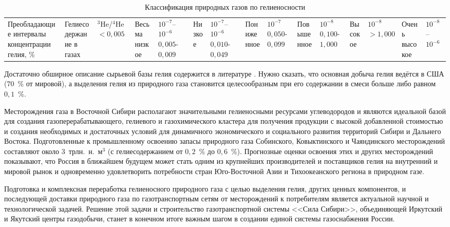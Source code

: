 \begin{table} [htbp]
	\centering
	\changecaptionwidth\captionwidth{15cm}
	\caption{Классификация природных газов по гелиеносности \cite{Yakuceni_Material_Base}}\label{tbl:He_deposit_classification}%
	\begin{tabular}{|p{5cm}||p{5cm}|p{3cm}|}
		\hline
		Преобладающие интервалы концентрации гелия, \%   & \centering Гелиесодержание в газах & \centering  $^3$He/$^4$He  \cr
		\hline
		\centering $<0,005$ & \centering  Весьма низкое  &\centering $10^{-7}$--$10^{-6}$  \cr
		\centering $0,005$-$0,009$ &\centering Низкое  &\centering $10^{-7}$--$10^{-6}$  \cr
		\centering $0,010$-$0,049$ &\centering Пониженное  &\centering $10^{-7}$  \cr		
		\centering $0,050$-$0,099$ &\centering Повышенное  &\centering $10^{-8}$  \cr		
		\centering $0,100$-$1,000$ &\centering Высокое  &\centering $10^{-8}$  \cr		
		\centering $>1,000$ &\centering Очень высокое  &\centering $10^{-8}$--$10^{-6}$ \cr		
		\hline
	\end{tabular}
\end{table}


Достаточно обширное описание сырьевой базы гелия содержится в литературе  \cite{Yakuceni_Material_Base, Kryukov}. Нужно сказать, что основная добыча гелия ведётся в США ($70$~\% от мировой), а  выделения гелия из природного газа становится  целесообразным при его содержании в смеси больше либо равном $0,1$~\%.

Месторождения газа в Восточной Сибири располагают значительными гелиеносными ресурсами углеводородов и являются идеальной базой для создания газоперерабатывающего, гелиевого и газохимического кластера для получения продукции с высокой добавленной стоимостью и создания необходимых и достаточных условий для динамичного экономического и социального развития территорий Сибири и Дальнего Востока. Подготовленные к промышленному освоению запасы природного газа Собинского, Ковыктинского и Чаяндинского месторождений составляют около $3$~трлн.~н.~м$^3$ (с гелиесодержанием от $0,2$~\% до $0,6$~\%). Прогнозные оценки освоения этих и других месторождений показывают, что Россия в ближайшем будущем может стать одним из крупнейших производителей и поставщиков гелия на внутренний и мировой рынок и одновременно удовлетворить потребности стран Юго-Восточной Азии и Тихоокеанского региона в природном газе.




Подготовка и комплексная переработка гелиеносного природного газа с целью выделения гелия, других ценных компонентов, и последующей доставки природного газа по газотранспортным сетям от месторождений к потребителям является актуальной научной и технологической задачей. Решение этой задачи и строительство газотранспортной системы <<Сила Сибири>>, объединяющей Иркутский и Якутский центры газодобычи, станет в конечном итоге важным шагом в создании единой системы газоснабжения России.

